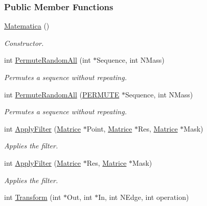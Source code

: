 \subsubsection*{\-Public \-Member \-Functions}
\begin{DoxyCompactItemize}
\item 
\hypertarget{classMatematica_ad7fef8b66845538830977c8db143e9ae}{\hyperlink{classMatematica_ad7fef8b66845538830977c8db143e9ae}{\-Matematica} ()}\label{classMatematica_ad7fef8b66845538830977c8db143e9ae}

\begin{DoxyCompactList}\small\item\em \-Constructor. \end{DoxyCompactList}\item 
\hypertarget{classMatematica_ab5122ddcd9bce12ff5049a5ad2b5cb6d}{int \hyperlink{classMatematica_ab5122ddcd9bce12ff5049a5ad2b5cb6d}{\-Permute\-Random\-All} (int $\ast$\-Sequence, int \-N\-Mass)}\label{classMatematica_ab5122ddcd9bce12ff5049a5ad2b5cb6d}

\begin{DoxyCompactList}\small\item\em \-Permutes a sequence without repeating. \end{DoxyCompactList}\item 
\hypertarget{classMatematica_a5ee47a0f414d52f4d97c5266677cc952}{int \hyperlink{classMatematica_a5ee47a0f414d52f4d97c5266677cc952}{\-Permute\-Random\-All} (\hyperlink{structPERMUTE}{\-P\-E\-R\-M\-U\-T\-E} $\ast$\-Sequence, int \-N\-Mass)}\label{classMatematica_a5ee47a0f414d52f4d97c5266677cc952}

\begin{DoxyCompactList}\small\item\em \-Permutes a sequence without repeating. \end{DoxyCompactList}\item 
int \hyperlink{classMatematica_a486baea1c22d2accfe267ef415b3abaf}{\-Apply\-Filter} (\hyperlink{classMatrice}{\-Matrice} $\ast$\-Point, \hyperlink{classMatrice}{\-Matrice} $\ast$\-Res, \hyperlink{classMatrice}{\-Matrice} $\ast$\-Mask)
\begin{DoxyCompactList}\small\item\em \-Applies the filter. \end{DoxyCompactList}\item 
int \hyperlink{classMatematica_a4b258fe1b33ec22774aa535d1390c746}{\-Apply\-Filter} (\hyperlink{classMatrice}{\-Matrice} $\ast$\-Res, \hyperlink{classMatrice}{\-Matrice} $\ast$\-Mask)
\begin{DoxyCompactList}\small\item\em \-Applies the filter. \end{DoxyCompactList}\item 
\hypertarget{classMatematica_a3c54bdff136c7c0107e035f80232c00f}{int \hyperlink{classMatematica_a3c54bdff136c7c0107e035f80232c00f}{\-Transform} (int $\ast$\-Out, int $\ast$\-In, int \-N\-Edge, int operation)}\label{classMatematica_a3c54bdff136c7c0107e035f80232c00f}


\end{DoxyCompactItemize}
